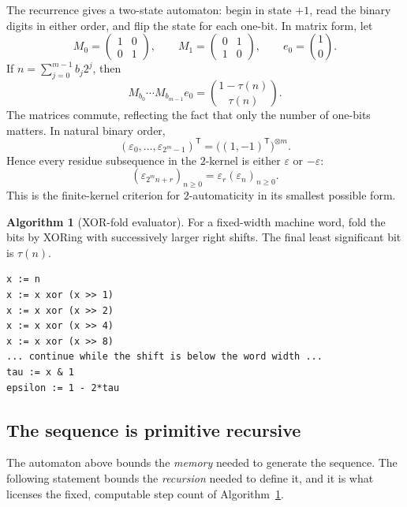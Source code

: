 \documentclass[11pt,oneside]{article}
\numberwithin{equation}{section}
\theoremstyle{definition}
\newtheorem{algorithm}[theorem]{Algorithm}
\theoremstyle{remark}
\newcommand{\eps}{\varepsilon}
\begin{document}
The recurrence gives a two-state automaton: begin in state \(+1\), read the
binary digits in either order, and flip the state for each one-bit.  In matrix
form, let
\begin{equation}
  M_0=\begin{pmatrix}1&0\\0&1\end{pmatrix},
  \qquad
  M_1=\begin{pmatrix}0&1\\1&0\end{pmatrix},
  \qquad
  e_0=\binom10.
  \label{eq:automaton-matrices}
\end{equation}
If \(n=\sum_{j=0}^{m-1}b_j2^j\), then
\begin{equation}
  M_{b_0}\cdots M_{b_{m-1}}e_0
  =\binom{1-\tau(n)}{\tau(n)}.
  \label{eq:automaton-output}
\end{equation}
The matrices commute, reflecting the fact that only the number of one-bits
matters.  In natural binary order,
\begin{equation}
  (\eps_0,\ldots,\eps_{2^m-1})^{\mathsf T}
  =\bigl((1,-1)^{\mathsf T}\bigr)^{\otimes m}.
  \label{eq:tensor-block}
\end{equation}
Hence every residue subsequence in the \(2\)-kernel is either \(\eps\) or
\(-\eps\):
\begin{equation}
  (\eps_{2^mn+r})_{n\ge0}=\eps_r(\eps_n)_{n\ge0}.
  \label{eq:two-kernel}
\end{equation}
This is the finite-kernel criterion for \(2\)-automaticity in its smallest
possible form.

\begin{algorithm}[XOR-fold evaluator]
\label{alg:xor-fold}
For a fixed-width machine word, fold the bits by XORing with successively
larger right shifts.  The final least significant bit is \(\tau(n)\).
\begin{lstlisting}[style=pseudo]
x := n
x := x xor (x >> 1)
x := x xor (x >> 2)
x := x xor (x >> 4)
x := x xor (x >> 8)
... continue while the shift is below the word width ...
tau := x & 1
epsilon := 1 - 2*tau
\end{lstlisting}
\end{algorithm}

\subsection{The sequence is primitive recursive}
\label{sec:primitive-recursive}

The automaton above bounds the \emph{memory} needed to generate the
sequence.  The following statement bounds the \emph{recursion} needed to
define it, and it is what licenses the fixed, computable step count of
Algorithm~\ref{alg:xor-fold}.
\end{document}
